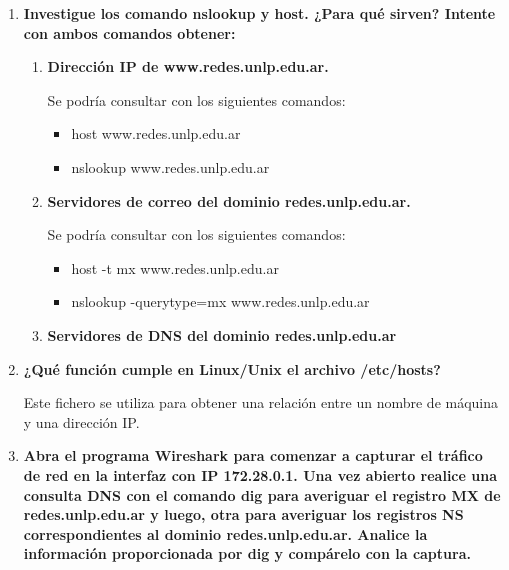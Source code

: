 \documentclass[a4paper,10pt]{article}
\begin{document}
\begin{enumerate}
        \item \textbf{Investigue los comando nslookup y host. ¿Para qué sirven? Intente con ambos comandos obtener:}
        
            \begin{enumerate}
                \item \textbf{Dirección IP de www.redes.unlp.edu.ar.}
                
                    Se podría consultar con los siguientes comandos:
                    \begin{itemize}
                        \item host www.redes.unlp.edu.ar
                        \item nslookup www.redes.unlp.edu.ar
                    \end{itemize}
                
                \item \textbf{Servidores de correo del dominio redes.unlp.edu.ar.}
                
                    Se podría consultar con los siguientes comandos:
                    \begin{itemize}
                        \item host -t mx www.redes.unlp.edu.ar
                        \item nslookup -querytype=mx www.redes.unlp.edu.ar
                    \end{itemize}
                    
                \item \textbf{Servidores de DNS del dominio redes.unlp.edu.ar}
            \end{enumerate}
        
        \item \textbf{ ¿Qué función cumple en Linux/Unix el archivo /etc/hosts?}
        
        Este fichero se utiliza para obtener una relación entre un nombre de máquina y una dirección IP.
        
        \item \textbf{Abra el programa Wireshark para comenzar a capturar el tráfico de red en la interfaz con IP 172.28.0.1. Una vez abierto realice una consulta DNS con el comando dig para averiguar el registro MX de redes.unlp.edu.ar y luego, otra para averiguar los registros NS correspondientes al dominio redes.unlp.edu.ar. Analice la información proporcionada por dig y compárelo con la captura.}
        

\end{enumerate}
\end{document}
